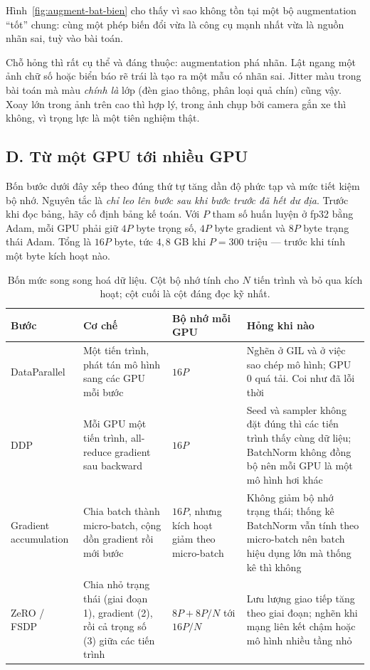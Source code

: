 \documentclass[../../../deep_learning.tex]{subfiles}
\begin{document}
Hình~\ref{fig:augment-bat-bien} cho thấy vì sao không tồn tại một bộ augmentation ``tốt'' chung: cùng một phép biến đổi vừa là công cụ mạnh nhất vừa là nguồn nhãn sai, tuỳ vào bài toán.

Chỗ hỏng thì rất cụ thể và đáng thuộc: augmentation phá nhãn. Lật ngang một ảnh chữ số hoặc biển báo rẽ trái là tạo ra một mẫu có nhãn sai. Jitter màu trong bài toán mà màu \emph{chính là} lớp (đèn giao thông, phân loại quả chín) cũng vậy. Xoay lớn trong ảnh trên cao thì hợp lý, trong ảnh chụp bởi camera gắn xe thì không, vì trọng lực là một tiên nghiệm thật.

\subsection{D. Từ một GPU tới nhiều GPU}
Bốn bước dưới đây xếp theo đúng thứ tự tăng dần độ phức tạp và mức tiết kiệm bộ nhớ. Nguyên tắc là \emph{chỉ leo lên bước sau khi bước trước đã hết dư địa}. Trước khi đọc bảng, hãy cố định bảng kế toán. Với \(P\) tham số huấn luyện ở fp32 bằng Adam, mỗi GPU phải giữ \(4P\) byte trọng số, \(4P\) byte gradient và \(8P\) byte trạng thái Adam. Tổng là \(16P\) byte, tức \(4{,}8\) GB khi \(P = 300\) triệu --- trước khi tính một byte kích hoạt nào.

\begin{table}[H]\centering\footnotesize
\caption{Bốn mức song song hoá dữ liệu. Cột bộ nhớ tính cho \(N\) tiến trình và bỏ qua kích hoạt; cột cuối là cột đáng đọc kỹ nhất.}
\label{tab:phan-tan}
\begin{tabularx}{\linewidth}{@{}L{2.55cm}L{3.15cm}L{2.05cm}Y@{}}
\toprule
\textbf{Bước} & \textbf{Cơ chế} & \textbf{Bộ nhớ mỗi GPU} & \textbf{Hỏng khi nào}\\
\midrule
DataParallel & Một tiến trình, phát tán mô hình sang các GPU mỗi bước & \(16P\) & Nghẽn ở GIL và ở việc sao chép mô hình; GPU \(0\) quá tải. Coi như đã lỗi thời\\
DDP & Mỗi GPU một tiến trình, all-reduce gradient sau backward & \(16P\) & Seed và sampler không đặt đúng thì các tiến trình thấy cùng dữ liệu; BatchNorm không đồng bộ nên mỗi GPU là một mô hình hơi khác\\
Gradient accumulation & Chia batch thành micro-batch, cộng dồn gradient rồi mới bước & \(16P\), nhưng kích hoạt giảm theo micro-batch & Không giảm bộ nhớ trạng thái; thống kê BatchNorm vẫn tính theo micro-batch nên batch hiệu dụng lớn mà thống kê thì không\\
ZeRO / FSDP \cite{rajbhandari2020zero} & Chia nhỏ trạng thái (giai đoạn 1), gradient (2), rồi cả trọng số (3) giữa các tiến trình & \(8P + 8P/N\) tới \(16P/N\) & Lưu lượng giao tiếp tăng theo giai đoạn; nghẽn khi mạng liên kết chậm hoặc mô hình nhiều tầng nhỏ\\
\bottomrule
\end{tabularx}
\end{table}
\end{document}
